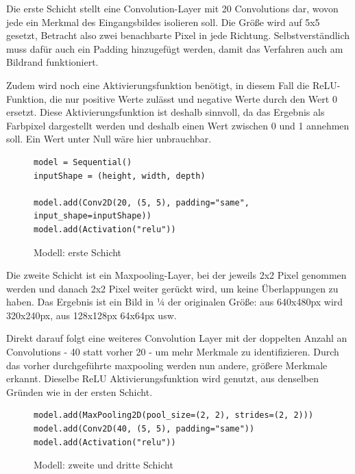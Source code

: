 \documentclass[conference]{IEEEtran}
\begin{document}
	Die erste Schicht stellt eine Convolution-Layer mit 20 Convolutions dar, 
	wovon jede ein Merkmal des Eingangsbildes isolieren soll.
	Die Größe wird auf 5x5 gesetzt, Betracht also zwei benachbarte Pixel in 
	jede Richtung.
	Selbstverständlich muss dafür auch ein Padding hinzugefügt werden, damit das Verfahren auch am Bildrand funktioniert. 
	
	Zudem wird noch eine Aktivierungsfunktion benötigt, in diesem Fall  die 
	ReLU-Funktion, die nur positive Werte zulässt und negative Werte durch 
	den Wert 0 ersetzt.
	Diese Aktivierungsfunktion ist deshalb sinnvoll, da das Ergebnis als 
	Farbpixel dargestellt werden und deshalb einen Wert zwischen 0 und 1 
	annehmen soll.
	Ein Wert unter Null wäre hier unbrauchbar.
	
	\begin{figure}[!h]
		\centering
		\begin{verbatim}
model = Sequential()
inputShape = (height, width, depth)

model.add(Conv2D(20, (5, 5), padding="same", input_shape=inputShape))
model.add(Activation("relu"))
		\end{verbatim}
		\caption{Modell: erste Schicht}
		\label{Schicht eins}
	\end{figure}
	
	Die zweite Schicht ist ein Maxpooling-Layer, bei der  jeweils 2x2 Pixel 
	genommen werden und danach 2x2 Pixel weiter gerückt wird, um keine 
	Überlappungen zu haben.
	Das Ergebnis ist ein Bild in ¼ der originalen Größe: aus 640x480px wird 320x240px, aus 128x128px 64x64px usw.
	
	Direkt darauf folgt eine weiteres Convolution Layer mit der doppelten 
	Anzahl an Convolutions - 40 statt vorher 20 - um mehr Merkmale zu 
	identifizieren.
	Durch das vorher durchgeführte maxpooling werden nun andere, größere Merkmale erkannt.
	 Dieselbe ReLU Aktivierungsfunktion wird genutzt, aus denselben 
	 Gründen wie in der ersten Schicht.
	
	\begin{figure}[!h]
		\centering
		\begin{verbatim}
model.add(MaxPooling2D(pool_size=(2, 2), strides=(2, 2)))
model.add(Conv2D(40, (5, 5), padding="same"))
model.add(Activation("relu"))
		\end{verbatim}
		\caption{Modell: zweite und dritte Schicht}
		\label{Schicht zwei und drei}
	\end{figure}
	
	
\end{document}
